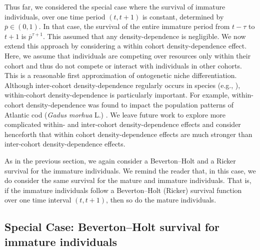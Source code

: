 \documentclass{article}
\numberwithin{theorem}{section}
\begin{document}
{Thus far, we considered the special case where the survival of immature individuals, over one time period $(t,t+1)$ is constant, determined by $\overline{p}\in (0,1)$. In that case, the survival of the entire immature period from $t-\tau$ to $t+1$ is $\overline{p}^{\tau+1}$. This assumed that any density-dependence is negligible. We now extend this approach by considering a within cohort density-dependence effect. Here, we assume that individuals are competing over resources only within their cohort and thus do not compete or interact with individuals in other cohorts. This is a reasonable first approximation of ontogenetic niche differentiation. Although inter-cohort density-dependence regularly occurs in species (e.g.,  \cite{gamelonDensityDependenceAgestructured2016}), within-cohort density-dependence is particularly important. For example, within-cohort density-dependence was found to impact the population patterns of Atlantic cod (\textit{Gadus morhua} L.) \cite{stensethDynamicsCoastalCod1999}. We leave future work to explore more complicated within- and inter-cohort density-dependence effects and consider henceforth that within cohort density-dependence effects are much stronger than inter-cohort density-dependence effects.

As in the previous section, we again consider a Beverton--Holt and a Ricker survival for the immature individuals. We remind the reader that, in this case, we do consider the same survival for the mature and immature individuals. That is, if the immature individuals follow a Beverton--Holt (Ricker) survival function over one time interval $(t,t+1)$, then  so do the mature individuals.


\subsection{Special Case: Beverton--Holt survival for immature individuals}

}
\end{document}
